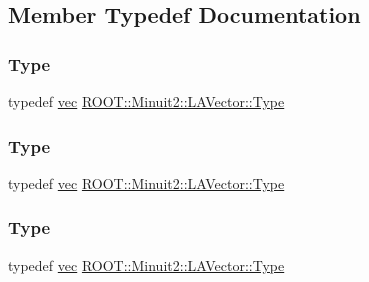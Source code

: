 \subsection{Member Typedef Documentation}
\mbox{\label{classROOT_1_1Minuit2_1_1LAVector_a3ca6d24ac34f5e322623ac131e090f20}} 
\subsubsection{\texorpdfstring{Type}{Type}\hspace{0.1cm}{\footnotesize\ttfamily [1/3]}}
{\footnotesize\ttfamily typedef \mbox{\hyperlink{classROOT_1_1Minuit2_1_1vec}{vec}} \mbox{\hyperlink{classROOT_1_1Minuit2_1_1LAVector_a3ca6d24ac34f5e322623ac131e090f20}{R\+O\+O\+T\+::\+Minuit2\+::\+L\+A\+Vector\+::\+Type}}}

\mbox{\label{classROOT_1_1Minuit2_1_1LAVector_a3ca6d24ac34f5e322623ac131e090f20}} 
\subsubsection{\texorpdfstring{Type}{Type}\hspace{0.1cm}{\footnotesize\ttfamily [2/3]}}
{\footnotesize\ttfamily typedef \mbox{\hyperlink{classROOT_1_1Minuit2_1_1vec}{vec}} \mbox{\hyperlink{classROOT_1_1Minuit2_1_1LAVector_a3ca6d24ac34f5e322623ac131e090f20}{R\+O\+O\+T\+::\+Minuit2\+::\+L\+A\+Vector\+::\+Type}}}

\mbox{\label{classROOT_1_1Minuit2_1_1LAVector_a3ca6d24ac34f5e322623ac131e090f20}} 
\subsubsection{\texorpdfstring{Type}{Type}\hspace{0.1cm}{\footnotesize\ttfamily [3/3]}}
{\footnotesize\ttfamily typedef \mbox{\hyperlink{classROOT_1_1Minuit2_1_1vec}{vec}} \mbox{\hyperlink{classROOT_1_1Minuit2_1_1LAVector_a3ca6d24ac34f5e322623ac131e090f20}{R\+O\+O\+T\+::\+Minuit2\+::\+L\+A\+Vector\+::\+Type}}}



